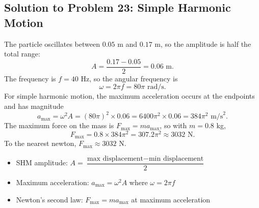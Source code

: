 \subsection{Solution to Problem 23: Simple Harmonic Motion}

\begin{solution}
The particle oscillates between $0.05$ m and $0.17$ m, so the amplitude is half the total range:
\[
A = \frac{0.17 - 0.05}{2} = 0.06 \text{ m}.
\]
The frequency is $f = 40$ Hz, so the angular frequency is
\[
\omega = 2\pi f = 80\pi \text{ rad/s}.
\]
For simple harmonic motion, the maximum acceleration occurs at the endpoints and has magnitude
\[
a_{\max} = \omega^2 A = (80\pi)^2 \times 0.06 = 6400\pi^2 \times 0.06 = 384\pi^2 \text{ m/s}^2.
\]
The maximum force on the mass is $F_{\max} = ma_{\max}$, so with $m = 0.8$ kg,
\[
F_{\max} = 0.8 \times 384\pi^2 = 307.2\pi^2 \approx 3032 \text{ N}.
\]
To the nearest newton, $F_{\max} \approx 3032$ N.
\end{solution}

\begin{takeaways}
\begin{itemize}
    \item SHM amplitude: $A = \dfrac{\text{max displacement} - \text{min displacement}}{2}$
    \item Maximum acceleration: $a_{\max} = \omega^2 A$ where $\omega = 2\pi f$
    \item Newton's second law: $F_{\max} = ma_{\max}$ at maximum acceleration
\end{itemize}
\end{takeaways}
